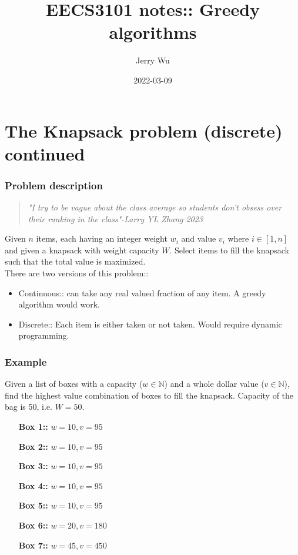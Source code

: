 \documentclass[12pt]{book}
\title{EECS3101 notes:: Greedy algorithms}
\author{Jerry Wu}
\date{2022-03-09}
\begin{document}
\maketitle

\chapter*{The Knapsack problem (discrete) continued}

\subsection*{Problem description}

\begin{quote}
    \textit{"I try to be vague about the class average so students don't obsess over their ranking in the class"-Larry YL Zhang 2023}
\end{quote}

Given $n$ items, each having an integer weight $w_i$ and value $v_i$ where $i\in [1,n]$ and given a knapsack with weight capacity $W$. Select items to fill the knapsack such that the total value is maximized.\\

There are two versions of this problem::

\begin{itemize}
    \item Continuous:: can take any real valued fraction of any item. A greedy algorithm would work.
    \item Discrete:: Each item is either taken or not taken. Would require dynamic programming.
\end{itemize}

\subsection*{Example}
Given a list of boxes with a capacity ($w\in \mathbb{N}$) and a whole dollar value ($v\in \mathbb{N}$), find the highest value combination of boxes to fill the knapsack. Capacity of the bag is 50, i.e. $W=50$.
\begin{itemize}
    \item[\textbf{Box 1::}] $w=10,v=95$
    \item[\textbf{Box 2::}] $w=10,v=95$
    \item[\textbf{Box 3::}] $w=10,v=95$
    \item[\textbf{Box 4::}] $w=10,v=95$
    \item[\textbf{Box 5::}] $w=10,v=95$
    \item[\textbf{Box 6::}] $w=20,v=180$
    \item[\textbf{Box 7::}] $w=45,v=450$
\end{itemize}
\end{document}
